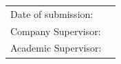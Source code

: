 \begin{titlepage}
\begin{center}
	\vfill
	\begin{tabular}{ll}
		Date of submission:                     & \abgabe \\[0.2cm]
		Company Supervisor:   & \betreuerFirma \\[0.2cm]
		Academic Supervisor: & \betreuerDhbw \\[2cm]
	\end{tabular} 
\end{center}
\end{titlepage}
